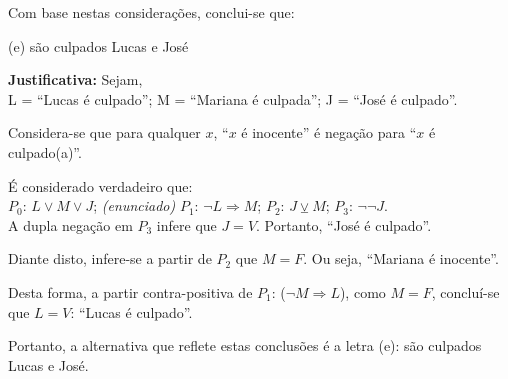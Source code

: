 \documentclass[12pt,letterpaper, onecolumn]{exam}
\begin{document}
\begin{questions}
    Com base nestas considerações, conclui-se que: 
    

    \begin{solution}
        (e) são culpados Lucas e José

        \textbf{Justificativa:} Sejam, \\[0.5em]
            L = “Lucas é culpado”;   \hfill
            M = “Mariana é culpada”; \hfill
            J = “José é culpado”.    

        Considera-se que para qualquer \(x\), “\(x\) é inocente” é negação para “\(x\) é culpado(a)”. 

        É considerado verdadeiro que: \\[1em]
        \(P_0\): \( L \vee M \vee J \); \textit{(enunciado)} \hfill
        \(P_1\): \( \neg L \Rightarrow M \); \hfill
        \(P_2\): \( J \veebar M \); \hfill
        \(P_3\): \( \neg \neg J \). \\[1em]
        A dupla negação em \(P_3\) infere que \(J = V\). Portanto, “José é culpado”.

        Diante disto, infere-se a partir de \(P_2\) que \(M = F\). Ou seja, “Mariana é inocente”.

        Desta forma, a partir contra-positiva de \(P_1\): (\( \neg M \Rightarrow L \)), como \(M = F\), concluí-se que \( L = V \): “Lucas é culpado”.
    
        Portanto, a alternativa que reflete estas conclusões é a letra (e): são culpados Lucas e José.
        

\end{solution}
\end{questions}
\end{document}
